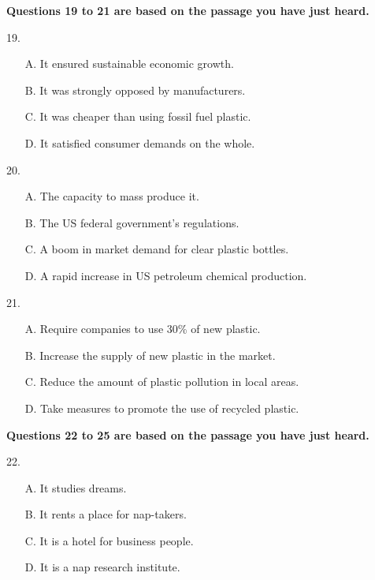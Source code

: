\documentclass[UTF8,11pt]{ctexart}
\begin{document}
\textbf{Questions 19 to 21 are based on the passage you have just heard.}


19.


\begin{itemize}[leftmargin=2em,itemsep=.2em,topsep=.4em]\item[A.] It ensured sustainable economic growth.
\item[B.] It was strongly opposed by manufacturers.
\item[C.] It was cheaper than using fossil fuel plastic.
\item[D.] It satisfied consumer demands on the whole.
\end{itemize}

20.


\begin{itemize}[leftmargin=2em,itemsep=.2em,topsep=.4em]\item[A.] The capacity to mass produce it.
\item[B.] The US federal government’s regulations.
\item[C.] A boom in market demand for clear plastic bottles.
\item[D.] A rapid increase in US petroleum chemical production.
\end{itemize}

21.


\begin{itemize}[leftmargin=2em,itemsep=.2em,topsep=.4em]\item[A.] Require companies to use 30\% of new plastic.
\item[B.] Increase the supply of new plastic in the market.
\item[C.] Reduce the amount of plastic pollution in local areas.
\item[D.] Take measures to promote the use of recycled plastic.
\end{itemize}

\textbf{Questions 22 to 25 are based on the passage you have just heard.}


22.


\begin{itemize}[leftmargin=2em,itemsep=.2em,topsep=.4em]\item[A.] It studies dreams.
\item[B.] It rents a place for nap-takers.
\item[C.] It is a hotel for business people.
\item[D.] It is a nap research institute.
\end{itemize}
\end{document}
